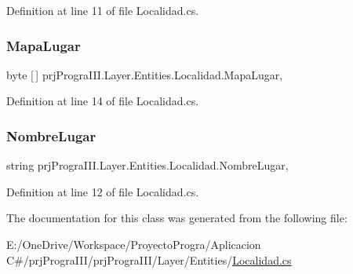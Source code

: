 Definition at line 11 of file Localidad.\+cs.

\hypertarget{classprj_progra_i_i_i_1_1_layer_1_1_entities_1_1_localidad_a24776f2be4b29d0dbb396daad22376be}{}\label{classprj_progra_i_i_i_1_1_layer_1_1_entities_1_1_localidad_a24776f2be4b29d0dbb396daad22376be} 
\subsubsection{\texorpdfstring{Mapa\+Lugar}{MapaLugar}}
{\footnotesize\ttfamily byte \mbox{[}$\,$\mbox{]} prj\+Progra\+I\+I\+I.\+Layer.\+Entities.\+Localidad.\+Mapa\+Lugar\hspace{0.3cm}{\ttfamily [get]}, {\ttfamily [set]}}



Definition at line 14 of file Localidad.\+cs.

\hypertarget{classprj_progra_i_i_i_1_1_layer_1_1_entities_1_1_localidad_a0ab4143e939704011d6a3d5fba1e61ec}{}\label{classprj_progra_i_i_i_1_1_layer_1_1_entities_1_1_localidad_a0ab4143e939704011d6a3d5fba1e61ec} 
\subsubsection{\texorpdfstring{Nombre\+Lugar}{NombreLugar}}
{\footnotesize\ttfamily string prj\+Progra\+I\+I\+I.\+Layer.\+Entities.\+Localidad.\+Nombre\+Lugar\hspace{0.3cm}{\ttfamily [get]}, {\ttfamily [set]}}



Definition at line 12 of file Localidad.\+cs.



The documentation for this class was generated from the following file\+:\begin{DoxyCompactItemize}
\item 
E\+:/\+One\+Drive/\+Workspace/\+Proyecto\+Progra/\+Aplicacion C\#/prj\+Progra\+I\+I\+I/prj\+Progra\+I\+I\+I/\+Layer/\+Entities/\hyperlink{_localidad_8cs}{Localidad.\+cs}\end{DoxyCompactItemize}
